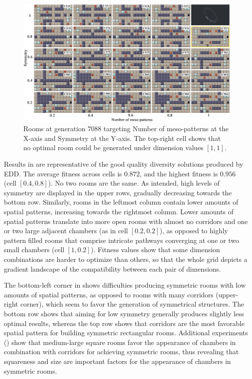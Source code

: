 \begin{figure}[ht]
\centerline{\includegraphics[width=\textwidth]{figure6.png}}
\caption{Rooms at generation $7088$ targeting Number of meso-patterns at the X-axis and Symmetry at the Y-axis. The top-right cell shows that no optimal room could be generated under dimension values $[1,1]$. }
\label{figs:meso_sym}
\end{figure}

Results in  are representative of the good quality diversity solutions produced by EDD. The average fitness across cells is $0.872$, and the highest fitness is $0.956$ (cell $[0.4,0.8]$). No two rooms are the same. As intended, high levels of symmetry are displayed in the upper rows, gradually decreasing towards the bottom row. Similarly, rooms in the leftmost column contain lower amounts of spatial patterns, increasing towards the rightmost column. Lower amounts of spatial patterns translate into more open rooms with almost no corridors and one or two large adjacent chambers (as in cell $[0.2, 0.2]$), as opposed to highly pattern filled rooms that comprise intricate pathways converging at one or two small chambers (cell $[1, 0.2]$). Fitness values show that some dimension combinations are harder to optimize than others, so that the whole grid depicts a gradient landscape of the compatibility between each pair of dimensions. 

The bottom-left corner in  shows difficulties producing symmetric rooms with low amounts of spatial patterns, as opposed to rooms with many corridors (upper-right corner), which seem to favor the generation of symmetrical structures. The bottom row shows that aiming for low symmetry generally produces slightly less optimal results, whereas the top row shows that corridors are the most favorable spatial pattern for building symmetric rectangular rooms. Additional experiments () show that medium-large square rooms favor the appearance of chambers in combination with corridors for achieving symmetric rooms, thus revealing that squareness and size are important factors for the appearance of chambers in symmetric rooms.

